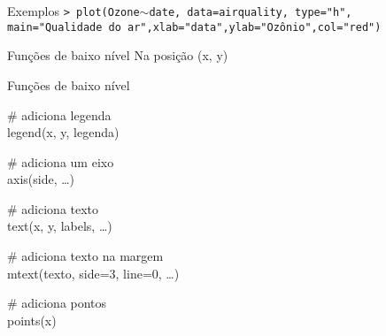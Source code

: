 \documentclass{beamer}
\begin{document}
\begin{frame}{Exemplos}
  \texttt{> plot(Ozone$\sim$date, data=airquality, type="h", main="Qualidade do ar",xlab="data",ylab="Ozônio",col="red")}
  \begin{center}
     
  \end{center}
\end{frame}

\begin{frame}{Funções de baixo nível}
Na posição (x, y)\\
  \begin{block}{Funções de baixo nível}

\# adiciona legenda \\
legend(x, y, legenda)\\  \vspace{10pt}

\# adiciona um eixo\\
axis(side, \ldots)\\  \vspace{10pt}

\# adiciona texto \\
text(x, y, labels, \ldots)\\  \vspace{10pt}

\# adiciona texto na margem \\
mtext(texto, side=3, line=0, \ldots)\\  \vspace{10pt}

\# adiciona pontos\\ 
points(x)\\
 \end{block}
  
\end{frame}
\end{document}

